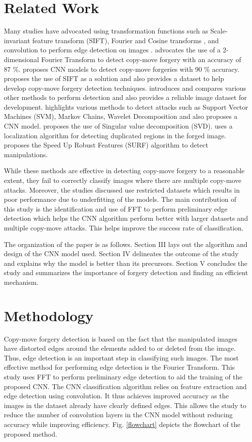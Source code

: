 \documentclass[conference]{IEEEtran}
\begin{document}
\section{Related Work}
Many studies have advocated using transformation functions such as Scale-invariant feature transform (SIFT), Fourier and Cosine transforms \cite{b19}, and convolution to perform edge detection on images \cite{b1}. \cite{b2} advocates the use of a 2-dimensional Fourier Transform to detect copy-move forgery with an accuracy of 87 \%. \cite{b3} proposes CNN models to detect copy-move forgeries with 90 \% accuracy. \cite{b4} proposes the use of SIFT as a solution and also provides a dataset to help develop copy-move forgery detection techniques. \cite{b5} introduces and compares various other methods to perform detection and also provides a reliable image dataset for development. \cite{b6} highlights various methods to detect attacks such as Support Vector Machines (SVM), Markov Chains, Wavelet Decomposition and also proposes a CNN model. \cite{b8} proposes the use of Singular value decomposition (SVD). \cite{b20} uses a localization algorithm for detecting duplicated regions in the forged image. \cite{b18} proposes the Speed Up Robust Features (SURF) algorithm to detect manipulations.

While these methods are effective in detecting copy-move forgery to a reasonable extent, they fail to correctly classify images where there are multiple copy-move attacks. Moreover, the studies discussed use restricted datasets which results in poor performance due to underfitting of the models. The main contribution of this study is the identification and use of FFT to perform preliminary edge detection which helps the CNN algorithm perform better with larger datasets and multiple copy-move attacks. This helps improve the success rate of classification.

The organization of the paper is as follows. Section III lays out the algorithm and design of the CNN model used. Section IV delineates the outcome of the study and explains why the model is better than its precursors. Section V concludes the study and summarizes the importance of forgery detection and finding an efficient mechanism.

\section{Methodology}
Copy-move forgery detection is based on the fact that the manipulated images have distorted edges around the elements added to or deleted from the image. Thus, edge detection is an important step in classifying such images. The most effective method for performing edge detection is the Fourier Transform. This study uses FFT to perform preliminary edge detection to aid the training of the proposed CNN. The CNN classification algorithm relies on feature extraction and edge detection using convolution. It thus achieves improved accuracy as the images in the dataset already have clearly defined edges. This allows the study to reduce the number of convolution layers in the CNN model without reducing accuracy while improving efficiency. Fig. \ref{flowchart} depicts the flowchart of the proposed method.
\end{document}
